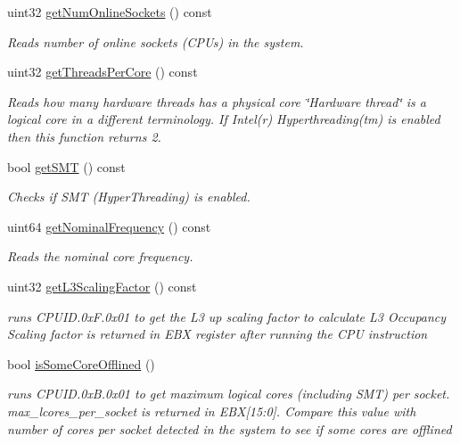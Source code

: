\begin{DoxyCompactItemize}
uint32 \mbox{\hyperlink{class_p_c_m_a9b3c25455743ff4475b237d7c338d4a2}{get\+Num\+Online\+Sockets}} () const
\begin{DoxyCompactList}\small\item\em Reads number of online sockets (C\+P\+Us) in the system. \end{DoxyCompactList}\item 
uint32 \mbox{\hyperlink{class_p_c_m_a850a9aeee162133adbc4b5d8df679639}{get\+Threads\+Per\+Core}} () const
\begin{DoxyCompactList}\small\item\em Reads how many hardware threads has a physical core \char`\"{}\+Hardware thread\char`\"{} is a logical core in a different terminology. If Intel(r) Hyperthreading(tm) is enabled then this function returns 2. \end{DoxyCompactList}\item 
bool \mbox{\hyperlink{class_p_c_m_a27548ccdca19f180dcc8acd2ca484669}{get\+S\+MT}} () const
\begin{DoxyCompactList}\small\item\em Checks if S\+MT (Hyper\+Threading) is enabled. \end{DoxyCompactList}\item 
uint64 \mbox{\hyperlink{class_p_c_m_a83cd795814da47148632b24e485e6075}{get\+Nominal\+Frequency}} () const
\begin{DoxyCompactList}\small\item\em Reads the nominal core frequency. \end{DoxyCompactList}\item 
uint32 \mbox{\hyperlink{class_p_c_m_a2cdc063d0b3fdf7c6b81ef4e5b4c341e}{get\+L3\+Scaling\+Factor}} () const
\begin{DoxyCompactList}\small\item\em runs C\+P\+U\+I\+D.\+0x\+F.\+0x01 to get the L3 up scaling factor to calculate L3 Occupancy Scaling factor is returned in E\+BX register after running the C\+PU instruction \end{DoxyCompactList}\item 
bool \mbox{\hyperlink{class_p_c_m_aab16be3893549f5f2d782071aeaead5f}{is\+Some\+Core\+Offlined}} ()
\begin{DoxyCompactList}\small\item\em runs C\+P\+U\+I\+D.\+0x\+B.\+0x01 to get maximum logical cores (including S\+MT) per socket. max\+\_\+lcores\+\_\+per\+\_\+socket is returned in E\+BX\mbox{[}15\+:0\mbox{]}. Compare this value with number of cores per socket detected in the system to see if some cores are offlined \end{DoxyCompactList}\item 

\end{DoxyCompactItemize}
